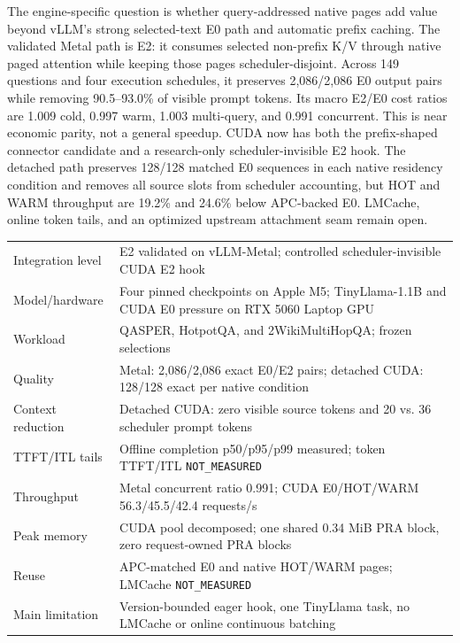 \documentclass[10pt]{article}
\begin{document}
The engine-specific question is whether query-addressed native pages add value
beyond vLLM's strong selected-text E0 path and automatic prefix caching. The
validated Metal path is E2: it consumes selected non-prefix K/V through native
paged attention while keeping those pages scheduler-disjoint. Across 149
questions and four execution schedules, it preserves 2,086/2,086 E0 output
pairs while removing 90.5--93.0\% of visible prompt tokens. Its macro E2/E0
cost ratios are 1.009 cold, 0.997 warm, 1.003 multi-query, and 0.991 concurrent.
This is near economic parity, not a general speedup. CUDA now has both the
prefix-shaped connector candidate and a research-only scheduler-invisible E2
hook. The detached path preserves 128/128 matched E0 sequences in each native
residency condition and removes all source slots from scheduler accounting, but
HOT and WARM throughput are 19.2\% and 24.6\% below APC-backed E0. LMCache,
online token tails, and an optimized upstream attachment seam remain open.

\begin{center}
\small
\begin{tabularx}{0.96\linewidth}{lX}
\toprule
Integration level & E2 validated on vLLM-Metal; controlled scheduler-invisible CUDA E2 hook\\
Model/hardware & Four pinned checkpoints on Apple M5; TinyLlama-1.1B and CUDA E0 pressure on RTX 5060 Laptop GPU\\
Workload & QASPER, HotpotQA, and 2WikiMultiHopQA; frozen selections\\
Quality & Metal: 2,086/2,086 exact E0/E2 pairs; detached CUDA: 128/128 exact per native condition\\
Context reduction & Detached CUDA: zero visible source tokens and 20 vs. 36 scheduler prompt tokens\\
TTFT/ITL tails & Offline completion p50/p95/p99 measured; token TTFT/ITL \texttt{NOT\_MEASURED}\\
Throughput & Metal concurrent ratio 0.991; CUDA E0/HOT/WARM 56.3/45.5/42.4 requests/s\\
Peak memory & CUDA pool decomposed; one shared 0.34 MiB PRA block, zero request-owned PRA blocks\\
Reuse & APC-matched E0 and native HOT/WARM pages; LMCache \texttt{NOT\_MEASURED}\\
Main limitation & Version-bounded eager hook, one TinyLlama task, no LMCache or online continuous batching\\
\bottomrule
\end{tabularx}
\end{center}
\end{document}

